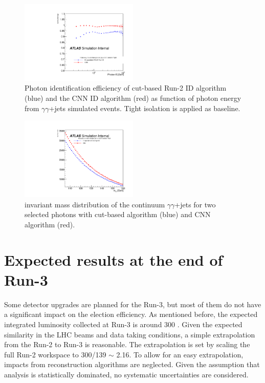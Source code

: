 \begin{figure}[htbp]
    \centering
    \includegraphics[width=0.5\textwidth]{Ch6/Img/Eff_Tight_All_Inclusive_Tight_E_Bkg.pdf}
    \begin{tcolorbox}[colback=black!5!white, colframe=white!75!black]
    \caption{Photon identification efficiency of cut-based Run-2 ID algorithm (blue) and the CNN ID algorithm (red) as function of photon energy from $\gamma\gamma$+jets simulated events. Tight isolation is applied as baseline.}
    \label{fig:HL-LHC:Run-3:CNN:Cont:E}
    \end{tcolorbox}
\end{figure}

\begin{figure}[htbp]
    \centering
    \includegraphics[width=0.5\textwidth]{Ch6/Img/Eff_Tight_All_Inclusive_Tight_M_Bkg.pdf}
     \begin{tcolorbox}[colback=black!5!white, colframe=white!75!black]
    \caption{\myy invariant mass distribution of the continuum $\gamma\gamma$+jets for two selected photons with cut-based algorithm (blue) and CNN algorithm (red).}
    \label{fig:HL-LHC:Run-3:CNN:Cont:M}
    \end{tcolorbox}
\end{figure}

\section{Expected results at the end of Run-3}
\label{Run-3}

Some detector upgrades are planned for the Run-3, but most of them do not have a significant impact on the \HHyybb election efficiency.  As mentioned before, the expected integrated luminosity collected at Run-3 is around 300 \ifb. Given the expected similarity in the LHC beams and data taking conditions, a simple extrapolation from the Run-2 to Run-3 is reasonable. The extrapolation is set by scaling the full Run-2 workspace to 300/139 $\sim$ 2.16. To allow for an easy extrapolation, impacts from reconstruction algorithms are neglected. Given the assumption that \HHyybb analysis is statistically dominated, no systematic uncertainties are considered. \\

